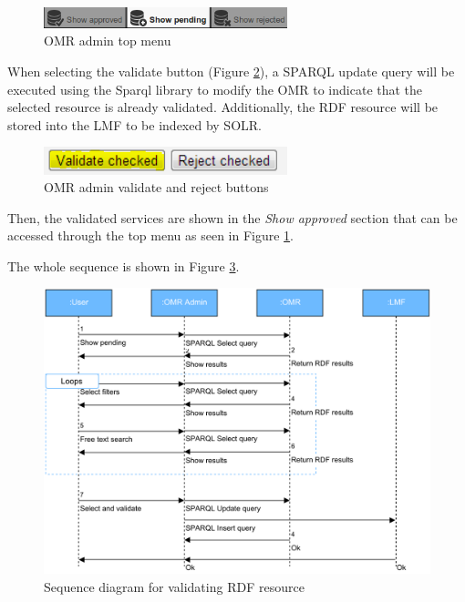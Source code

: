 \begin{figure}[h]
	\centering
	\includegraphics[width=200pt]{graphics/admin-top-menu.png}
	\caption{OMR admin top menu}
	\label{fig:admintopmenu}
\end{figure}

When selecting the validate button (Figure \ref{fig:validatebutton}), a SPARQL update query will be executed using the Sparql library to modify the OMR to indicate that the selected resource is already validated. Additionally, the RDF resource will be stored into the LMF to be indexed by SOLR.

\begin{figure}[h]
	\centering
	\includegraphics[width=200pt]{graphics/omr-validate-buttons.png}
	\caption{OMR admin validate and reject buttons}
	\label{fig:validatebutton}
\end{figure}

Then, the validated services are shown in the \textit{Show approved} section that can be accessed through the top menu as seen in Figure \ref{fig:admintopmenu}.

The whole sequence is shown in Figure \ref{fig:validatesequence}.


\begin{figure}[h]
	\centering
	\includegraphics[width=350pt]{graphics/Diagrama_secuencia_validar.pdf}
	\caption{Sequence diagram for validating RDF resource}
	\label{fig:validatesequence}
\end{figure}
\newpage
